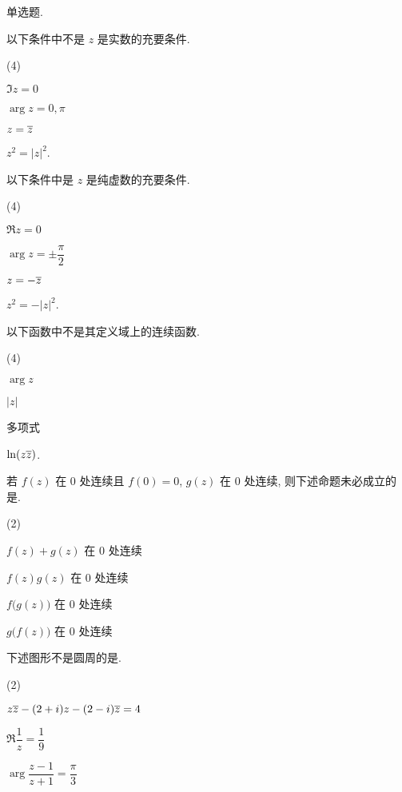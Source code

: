 \sectionHomework
\begin{homework}
  \item 单选题.
  \begin{subex}
    \item 以下条件中\fillbrace{}不是 $z$ 是实数的充要条件.
    \begin{exchoice}(4)
      \item $\Im z=0$
      \item $\arg z=0,\pi$
      \item $z=\overline z$
      \item $z^2=|z|^2$.
    \end{exchoice}
    \item 以下条件中\fillbrace{}是 $z$ 是纯虚数的充要条件.
    \begin{exchoice}(4)
      \item $\Re z=0$
      \item $\arg z=\pm\dfrac\pi2$
      \item $z=-\overline z$
      \item $z^2=-|z|^2$.
    \end{exchoice}
    \item 以下函数中\fillbrace{}不是其定义域上的连续函数.
    \begin{exchoice}(4)
      \item $\arg z$
      \item $|z|$
      \item 多项式
      \item $\ln(z\overline z)$.
    \end{exchoice}
    \item 若 $f(z)$ 在 $0$ 处连续且 $f(0)=0$, $g(z)$ 在 $0$ 处连续, 则下述命题未必成立的是\fillbrace{}.
    \begin{exchoice}(2)
      \item $f(z)+g(z)$ 在 $0$ 处连续
      \item $f(z)g(z)$ 在 $0$ 处连续
      \item $f\bigl(g(z)\bigr)$ 在 $0$ 处连续
      \item $g\bigl(f(z)\bigr)$ 在 $0$ 处连续
    \end{exchoice}
    \item 下述图形不是圆周的是\fillbrace{}.
    \begin{exchoice}(2)
      \item $z\overline z-(2+i)z-(2-i)\overline z=4$
      \item $\Re\dfrac{1}{z}=\dfrac{1}{9}$
      \item $\arg\dfrac{z-1}{z+1}=\dfrac{\pi}{3}$

\end{exchoice}
\end{subex}
\end{homework}
